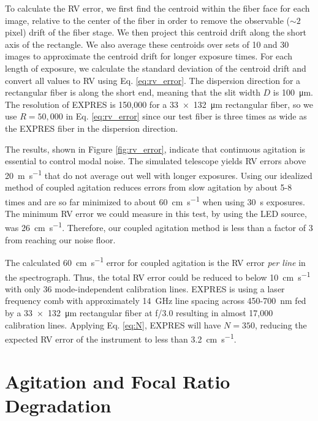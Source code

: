 \documentclass[twocolumn]{emulateapj}
\begin{document}
To calculate the RV error, we first find the centroid within the fiber face for each image, relative to the center of the fiber in order to remove the observable ($\sim 2$ pixel) drift of the fiber stage. We then project this centroid drift along the short axis of the rectangle. We also average these centroids over sets of 10 and 30 images to approximate the centroid drift for longer exposure times. For each length of exposure, we calculate the standard deviation of the centroid drift and convert all values to RV using Eq. \ref{eq:rv_error}. The dispersion direction for a rectangular fiber is along the short end, meaning that the slit width $D$ is \SI{100}{\micro\meter}. The resolution of EXPRES is 150,000 for a \SI{33x132}{\micro\meter} rectangular fiber, so we use $R=50,000$ in Eq. \ref{eq:rv_error} since our test fiber is three times as wide as the EXPRES fiber in the dispersion direction.

The results, shown in Figure \ref{fig:rv_error}, indicate that continuous agitation is essential to control modal noise. The simulated telescope yields RV errors above \SI{20}{\meter\per\second} that do not average out well with longer exposures. Using our idealized method of coupled agitation reduces errors from slow agitation by about 5-8 times and are so far minimized to about \SI{60}{\centi\meter\per\second} when using \SI{30}{\second} exposures. The minimum RV error we could measure in this test, by using the LED source, was \SI{26}{\centi\meter\per\second}. Therefore, our coupled agitation method is less than a factor of 3 from reaching our noise floor.

The calculated \SI{60}{\centi\meter\per\second} error for coupled agitation is the RV error \textit{per line} in the spectrograph. Thus, the total RV error could be reduced to below \SI{10}{\centi\meter\per\second} with only 36 mode-independent calibration lines. EXPRES is using a laser frequency comb with approximately {\SI{14}{\giga\hertz}} line spacing across 450-{\SI{700}{\nano\meter}} fed by a {\SI{33x132}{\micro\meter}} rectangular fiber at f/3.0 resulting in almost 17,000 calibration lines. Applying Eq. {\ref{eq:N}}, EXPRES will have $N=350$, reducing the expected RV error of the instrument to less than {\SI{3.2}{\centi\meter\per\second}}.

\section{Agitation and Focal Ratio Degradation}
\label{sec:frd}
\end{document}
